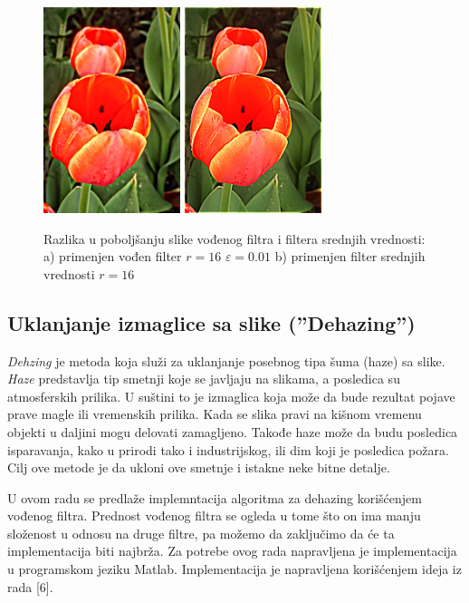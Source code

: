 \documentclass[a4paper,12pt,titlepage]{article}
\begin{document}
\begin{figure}[ht!]
\centering
\includegraphics[width=40mm]{img/flowerER.png}
\includegraphics[width=40mm]{img/flowerERAvg.png}
\caption{Razlika u poboljšanju slike vođenog filtra i filtera srednjih vrednosti: a) primenjen vođen filter $r = 16$ $\varepsilon = 0.01$ b) primenjen filter srednjih vrednosti $r = 16$  }
\label{enha1}
\end{figure}

\newpage
\subsection{Uklanjanje izmaglice sa slike (''Dehazing'')}%

\emph{Dehzing} je metoda koja služi za uklanjanje posebnog tipa šuma (haze) sa slike. \emph{Haze} predstavlja tip smetnji koje se javljaju na slikama, a posledica su atmosferskih prilika. U suštini to je izmaglica koja može da bude rezultat pojave prave magle ili vremenskih prilika. Kada se slika pravi na kišnom vremenu objekti u daljini mogu delovati zamagljeno. Takođe haze može da budu posledica isparavanja, kako u prirodi tako i industrijskog, ili dim koji je posledica požara. Cilj ove metode je da ukloni ove smetnje i istakne neke bitne detalje.

U ovom radu se predlaže implemntacija algoritma za dehazing korišćenjem vođenog filtra. Prednost vođenog filtra se ogleda u tome što on ima manju složenost u odnosu na druge filtre, pa možemo da zaključimo da će ta implementacija biti najbrža. Za potrebe ovog rada napravljena je implementacija u programskom jeziku Matlab. Implementacija je napravljena korišćenjem ideja iz rada [6]. 
\end{document}
